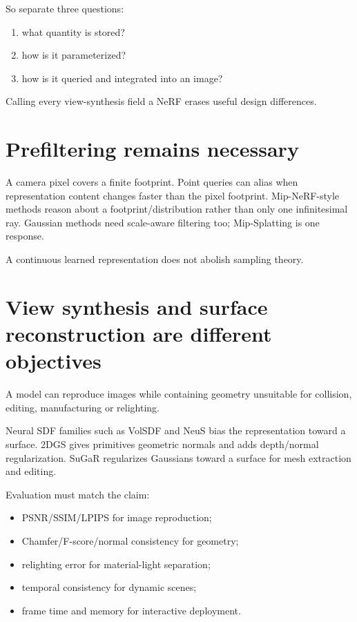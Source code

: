 So separate three questions:

\begin{enumerate}
\def\labelenumi{\arabic{enumi}.}
\tightlist
\item
  what quantity is stored?
\item
  how is it parameterized?
\item
  how is it queried and integrated into an image?
\end{enumerate}

Calling every view-synthesis field a NeRF erases useful design differences.

\section{Prefiltering remains necessary}\label{04-visual-computing-ii-ch035-prefiltering-remains-necessary}

A camera pixel covers a finite footprint. Point queries can alias when representation content changes faster than the pixel footprint. Mip-NeRF-style methods reason about a footprint/distribution rather than only one infinitesimal ray. Gaussian methods need scale-aware filtering too; Mip-Splatting is one response.

A continuous learned representation does not abolish sampling theory.

\section{View synthesis and surface reconstruction are different objectives}\label{04-visual-computing-ii-ch035-view-synthesis-and-surface-reconstruction-are-different-objectives}

A model can reproduce images while containing geometry unsuitable for collision, editing, manufacturing or relighting.

Neural SDF families such as VolSDF and NeuS bias the representation toward a surface. 2DGS gives primitives geometric normals and adds depth/normal regularization. SuGaR regularizes Gaussians toward a surface for mesh extraction and editing.

Evaluation must match the claim:

\begin{itemize}
\tightlist
\item
  PSNR/SSIM/LPIPS for image reproduction;
\item
  Chamfer/F-score/normal consistency for geometry;
\item
  relighting error for material-light separation;
\item
  temporal consistency for dynamic scenes;
\item
  frame time and memory for interactive deployment.
\end{itemize}

